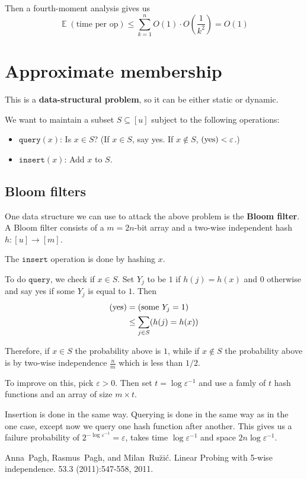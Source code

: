 \documentclass[11pt]{article}
\DeclareMathOperator*{\E}{\mathbb{E}}
\let\Pr\relax
\DeclareMathOperator*{\Pr}{\mathbb{P}}
\begin{document}
Then a fourth-moment analysis gives us 
$$\E(\text{time per op}) \leq \sum_{k=1}^n O(1) \cdot O(\frac{1}{k^2}) = O(1)$$

\section{Approximate membership}

This is a \textbf{data-structural problem}, so it can be either static or dynamic. 

We want to maintain a subset $S \subseteq [u]$ subject to the following operations:
\begin{itemize}
  \item $\texttt{query}(x)$: Is $x \in S$? (If $x \in S$, say yes. If $x \not\in S$, $\Pr(\text{yes}) < \varepsilon$.)
  \item $\texttt{insert}(x)$: Add $x$ to $S$. 
\end{itemize}

\subsection{Bloom filters}

One data structure we can use to attack the above problem is the \textbf{Bloom filter}. A Bloom filter consists of a $m = 2n$-bit array and a two-wise independent hash $h:[u] \to [m]$. 

The $\texttt{insert}$ operation is done by hashing $x$. 

To do $\texttt{query}$, we check if $x \in S$. Set $Y_j$ to be $1$ if $h(j) = h(x)$ and $0$ otherwise and say yes if some $Y_j$ is equal to $1$. Then 
\begin{align*}
  \Pr(\text{yes}) &= \Pr(\text{some $Y_j = 1$}) \\
  &\leq \sum_{j \in S} \Pr(h(j) = h(x)) \\
\end{align*}

Therefore, if $x \in S$ the probability above is $1$, while if $x \not\in S$ the probability above is by two-wise independence $\frac{n}{m}$ which is less than $1/2$. 

To improve on this, pick $\varepsilon > 0$. Then set $t = \log \varepsilon^{-1}$ and use a famly of $t$ hash functions and an array of size $m \times t$. 

Insertion is done in the same way. Querying is done in the same way as in the one case, except now we query one hash function after another. This gives us a failure probability of $2^{-\log \varepsilon^{-1}} = \varepsilon$, takes time $\log \varepsilon^{-1}$ and space $2n\log \varepsilon^{-1}$. 


\begin{thebibliography}{42}

Anna~Pagh, Rasmus~Pagh, and Milan~Ru\u{z}i\'{c}.
\newblock Linear Probing with 5-wise independence. 
 53.3 (2011):547-558, 2011.

\end{thebibliography}
\end{document}
